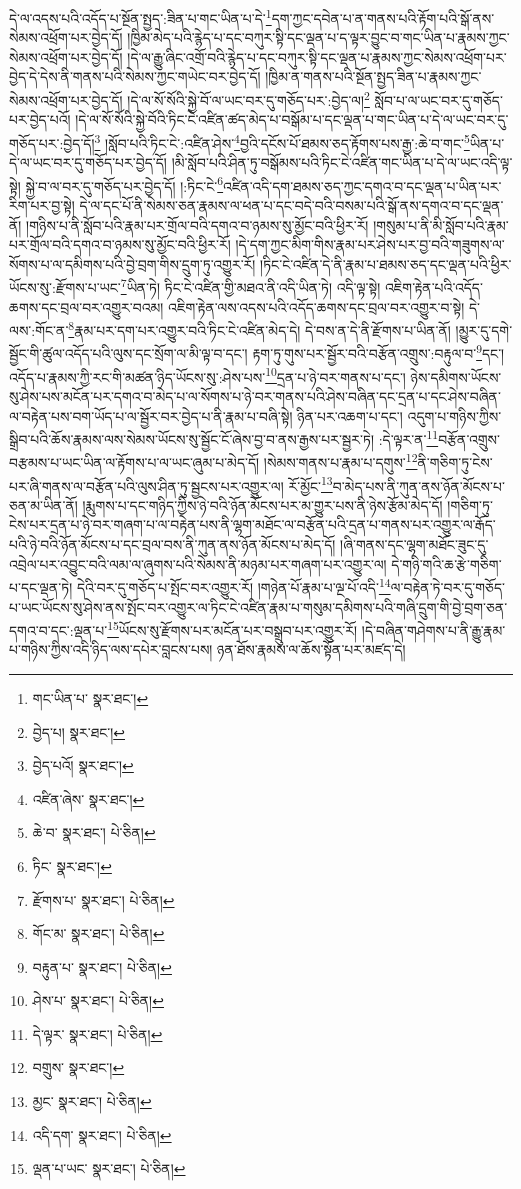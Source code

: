དེ་ལ་འདས་པའི་འདོད་པ་སྔོན་སྤྱད་:ཟིན་པ་གང་ཡིན་པ་དེ་\footnote{གང་ཡིན་པ་  སྣར་ཐང་། }དག་ཀྱང་དབེན་པ་ན་གནས་པའི་རྟོག་པའི་སྒོ་ནས་སེམས་འཕྲོག་པར་བྱེད་དོ། །ཁྱིམ་མེད་པའི་རྙེད་པ་དང་བཀུར་སྟི་དང་ལྡན་པ་ད་ལྟར་བྱུང་བ་གང་ཡིན་པ་རྣམས་ཀྱང་སེམས་འཕྲོག་པར་བྱེད་དོ། །དེ་ལ་རྒྱུ་ཞིང་འགྲོ་བའི་རྙེད་པ་དང་བཀུར་སྟི་དང་ལྡན་པ་རྣམས་ཀྱང་སེམས་འཕྲོག་པར་བྱེད་དེ་དེས་ནི་གནས་པའི་སེམས་ཀྱང་གཡེང་བར་བྱེད་དོ། །ཁྱིམ་ན་གནས་པའི་སྔོན་སྤྱད་ཟིན་པ་རྣམས་ཀྱང་སེམས་འཕྲོག་པར་བྱེད་དོ། །དེ་ལ་སོ་སོའི་སྐྱེ་བོ་ལ་ཡང་བར་དུ་གཅོད་པར་:བྱེད་ལ།\footnote{བྱེད་པ།  སྣར་ཐང་། } སློབ་པ་ལ་ཡང་བར་དུ་གཅོད་པར་བྱེད་པའོ། །དེ་ལ་སོ་སོའི་སྐྱེ་བོའི་ཏིང་ངེ་འཛིན་ཚད་མེད་པ་བསྒོམ་པ་དང་ལྡན་པ་གང་ཡིན་པ་དེ་ལ་ཡང་བར་དུ་གཅོད་པར་:བྱེད་དོ།\footnote{བྱེད་པའོ།  སྣར་ཐང་། } །སློབ་པའི་ཏིང་ངེ་:འཛིན་ཤེས་\footnote{འཛིན་ཞེས་  སྣར་ཐང་། }བྱའི་དངོས་པོ་ཐམས་ཅད་རྟོགས་པས་རྒྱ་:ཆེ་བ་གང་\footnote{ཆེ་བ་  སྣར་ཐང་།  པེ་ཅིན། }ཡིན་པ་དེ་ལ་ཡང་བར་དུ་གཅོད་པར་བྱེད་དོ། །མི་སློབ་པའི་ཤིན་ཏུ་བསྒོམས་པའི་ཏིང་ངེ་འཛིན་གང་ཡིན་པ་དེ་ལ་ཡང་འདི་ལྟ་སྟེ། སྐྱེ་བ་ལ་བར་དུ་གཅོད་པར་བྱེད་དོ། །:ཏིང་ངེ་\footnote{ཏིང་  སྣར་ཐང་། }འཛིན་འདི་དག་ཐམས་ཅད་ཀྱང་དགའ་བ་དང་ལྡན་པ་ཡིན་པར་རིག་པར་བྱ་སྟེ། དེ་ལ་དང་པོ་ནི་སེམས་ཅན་རྣམས་ལ་ཕན་པ་དང་བདེ་བའི་བསམ་པའི་སྒོ་ནས་དགའ་བ་དང་ལྡན་ནོ། །གཉིས་པ་ནི་སློབ་པའི་རྣམ་པར་གྲོལ་བའི་དགའ་བ་ཉམས་སུ་མྱོང་བའི་ཕྱིར་རོ། །གསུམ་པ་ནི་མི་སློབ་པའི་རྣམ་པར་གྲོལ་བའི་དགའ་བ་ཉམས་སུ་མྱོང་བའི་ཕྱིར་རོ། །དེ་དག་ཀྱང་མིག་གིས་རྣམ་པར་ཤེས་པར་བྱ་བའི་གཟུགས་ལ་སོགས་པ་ལ་དམིགས་པའི་བྱེ་བྲག་གིས་དྲུག་ཏུ་འགྱུར་རོ། །ཏིང་ངེ་འཛིན་དེ་ནི་རྣམ་པ་ཐམས་ཅད་དང་ལྡན་པའི་ཕྱིར་ཡོངས་སུ་:རྫོགས་པ་ཡང་\footnote{རྫོགས་པ་  སྣར་ཐང་།  པེ་ཅིན། }ཡིན་ཏེ། ཏིང་ངེ་འཛིན་གྱི་མཐའ་ནི་འདི་ཡིན་ཏེ། འདི་ལྟ་སྟེ། འཇིག་རྟེན་པའི་འདོད་ཆགས་དང་བྲལ་བར་འགྱུར་བའམ། འཇིག་རྟེན་ལས་འདས་པའི་འདོད་ཆགས་དང་བྲལ་བར་འགྱུར་བ་སྟེ། དེ་ལས་:གོང་ན་\footnote{གོང་མ་  སྣར་ཐང་།  པེ་ཅིན། }རྣམ་པར་དག་པར་འགྱུར་བའི་ཏིང་ངེ་འཛིན་མེད་དེ། དེ་བས་ན་དེ་ནི་རྫོགས་པ་ཡིན་ནོ། །མྱུར་དུ་དགེ་སྦྱོང་གི་ཚུལ་འདོད་པའི་ལུས་དང་སྲོག་ལ་མི་ལྟ་བ་དང་། རྟག་ཏུ་གུས་པར་སྦྱོར་བའི་བརྩོན་འགྲུས་:བརྟུལ་བ་\footnote{བརྟུན་པ་  སྣར་ཐང་།  པེ་ཅིན། }དང་། འདོད་པ་རྣམས་ཀྱི་རང་གི་མཚན་ཉིད་ཡོངས་སུ་:ཤེས་པས་\footnote{ཤེས་པ་  སྣར་ཐང་།  པེ་ཅིན། }དྲན་པ་ཉེ་བར་གནས་པ་དང་། ཉེས་དམིགས་ཡོངས་སུ་ཤེས་པས་མངོན་པར་དགའ་བ་མེད་པ་ལ་སོགས་པ་ཉེ་བར་གནས་པའི་ཤེས་བཞིན་དང་དྲན་པ་དང་ཤེས་བཞིན་ལ་བརྟེན་པས་བག་ཡོད་པ་ལ་སྦྱོར་བར་བྱེད་པ་ནི་རྣམ་པ་བཞི་སྟེ། ཉིན་པར་འཆག་པ་དང་། འདུག་པ་གཉིས་ཀྱིས་སྒྲིབ་པའི་ཆོས་རྣམས་ལས་སེམས་ཡོངས་སུ་སྦྱོང་ངོ་ཞེས་བྱ་བ་ནས་རྒྱས་པར་སྦྱར་ཏེ། :དེ་ལྟར་ན་\footnote{དེ་ལྟར་  སྣར་ཐང་།  པེ་ཅིན། }བརྩོན་འགྲུས་བརྩམས་པ་ཡང་ཡིན་ལ་རྟོགས་པ་ལ་ཡང་ཞུམ་པ་མེད་དོ། །སེམས་གནས་པ་རྣམ་པ་དགུས་\footnote{བགྲུས་  སྣར་ཐང་། }ནི་གཅིག་ཏུ་ངེས་པར་ཞི་གནས་ལ་བརྩོན་པའི་ལུས་ཤིན་ཏུ་སྦྱངས་པར་འགྱུར་ལ། རོ་མྱོང་\footnote{མྱང་  སྣར་ཐང་།  པེ་ཅིན། }བ་མེད་པས་ནི་ཀུན་ནས་ཉོན་མོངས་པ་ཅན་མ་ཡིན་ནོ། །རྨུགས་པ་དང་གཉིད་ཀྱིས་ཉེ་བའི་ཉོན་མོངས་པར་མ་གྱུར་པས་ནི་ཉེས་རྩོམ་མེད་དོ། །གཅིག་ཏུ་ངེས་པར་དྲན་པ་ཉེ་བར་གཞག་པ་ལ་བརྟེན་པས་ནི་ལྷག་མཐོང་ལ་བརྩོན་པའི་དྲན་པ་གནས་པར་འགྱུར་ལ་རྒོད་པའི་ཉེ་བའི་ཉོན་མོངས་པ་དང་བྲལ་བས་ནི་ཀུན་ནས་ཉོན་མོངས་པ་མེད་དོ། །ཞི་གནས་དང་ལྷག་མཐོང་ཟུང་དུ་འབྲེལ་པར་འབྱུང་བའི་ལམ་ལ་ཞུགས་པའི་སེམས་ནི་མཉམ་པར་གཞག་པར་འགྱུར་ལ། དེ་གཉི་གའི་ཆ་རྩེ་གཅིག་པ་དང་ལྡན་ཏེ། དེའི་བར་དུ་གཅོད་པ་སྤོང་བར་འགྱུར་རོ། །གཉེན་པོ་རྣམ་པ་ལྔ་པོ་འདི་\footnote{འདི་དག་  སྣར་ཐང་།  པེ་ཅིན། }ལ་བརྟེན་ཏེ་བར་དུ་གཅོད་པ་ཡང་ཡོངས་སུ་ཤེས་ནས་སྤོང་བར་འགྱུར་ལ་ཏིང་ངེ་འཛིན་རྣམ་པ་གསུམ་དམིགས་པའི་གཞི་དྲུག་གི་བྱེ་བྲག་ཅན་དགའ་བ་དང་:ལྡན་པ་\footnote{ལྡན་པ་ཡང་  སྣར་ཐང་།  པེ་ཅིན། }ཡོངས་སུ་རྫོགས་པར་མངོན་པར་བསྒྲུབ་པར་འགྱུར་རོ། །དེ་བཞིན་གཤེགས་པ་ནི་རྒྱུ་རྣམ་པ་གཉིས་ཀྱིས་འདི་ཉིད་ལས་དཔེར་བླངས་པས། ཉན་ཐོས་རྣམས་ལ་ཆོས་སྟོན་པར་མཛད་དེ། 